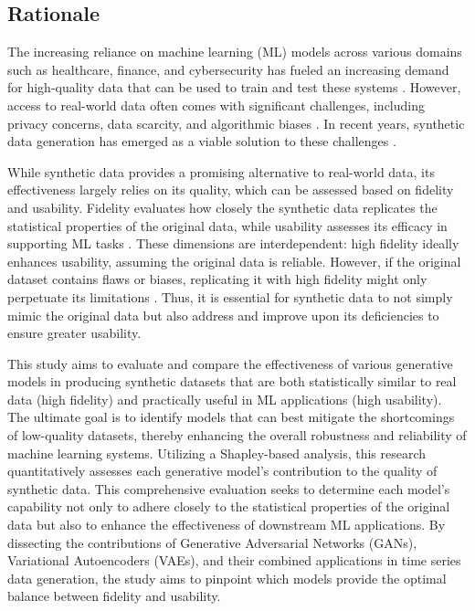 \documentclass{article}
\begin{document}
\subsection{Rationale}
The increasing reliance on machine learning (ML) models across various domains such as healthcare, finance, and cybersecurity has fueled an increasing demand for high-quality data that can be used to train and test these systems \parencite{jordon_synthetic_2022, goyal_systematic_2024}. However, access to real-world data often comes with significant challenges, including privacy concerns, data scarcity, and algorithmic biases \parencite{lu_machine_2024, hudovernik_benchmarking_2024}. In recent years, synthetic data generation has emerged as a viable solution to these challenges \parencite{goyal_systematic_2024}.

While synthetic data provides a promising alternative to real-world data, its effectiveness largely relies on its quality, which can be assessed based on fidelity and usability. Fidelity evaluates how closely the synthetic data replicates the statistical properties of the original data, while usability assesses its efficacy in supporting ML tasks \parencite{loni_review_2025}. These dimensions are interdependent: high fidelity ideally enhances usability, assuming the original data is reliable. However, if the original dataset contains flaws or biases, replicating it with high fidelity might only perpetuate its limitations \parencite{shahul_hameed_bias_2024}. Thus, it is essential for synthetic data to not simply mimic the original data but also address and improve upon its deficiencies to ensure greater usability.

This study aims to evaluate and compare the effectiveness of various generative models in producing synthetic datasets that are both statistically similar to real data (high fidelity) and practically useful in ML applications (high usability). The ultimate goal is to identify models that can best mitigate the shortcomings of low-quality datasets, thereby enhancing the overall robustness and reliability of machine learning systems. Utilizing a Shapley-based analysis, this research quantitatively assesses each generative model's contribution to the quality of synthetic data. This comprehensive evaluation seeks to determine each model's capability not only to adhere closely to the statistical properties of the original data but also to enhance the effectiveness of downstream ML applications. By dissecting the contributions of Generative Adversarial Networks (GANs), Variational Autoencoders (VAEs), and their combined applications in time series data generation, the study aims to pinpoint which models provide the optimal balance between fidelity and usability.
\end{document}
